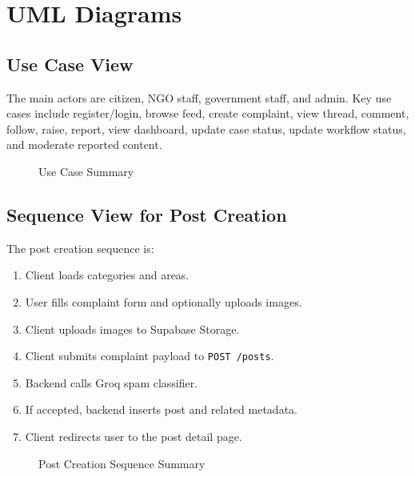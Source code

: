 \documentclass[12pt,a4paper]{report}
\begin{document}
\section{UML Diagrams}
\subsection{Use Case View}
The main actors are citizen, NGO staff, government staff, and admin. Key use cases include register/login, browse feed, create complaint, view thread, comment, follow, raise, report, view dashboard, update case status, update workflow status, and moderate reported content.

\begin{figure}[H]
\centering
{}
\caption{Use Case Summary}
\end{figure}

\subsection{Sequence View for Post Creation}
The post creation sequence is:
\begin{enumerate}
  \item Client loads categories and areas.
  \item User fills complaint form and optionally uploads images.
  \item Client uploads images to Supabase Storage.
  \item Client submits complaint payload to \texttt{POST /posts}.
  \item Backend calls Groq spam classifier.
  \item If accepted, backend inserts post and related metadata.
  \item Client redirects user to the post detail page.
\end{enumerate}

\begin{figure}[H]
\centering
{}
\caption{Post Creation Sequence Summary}
\end{figure}
\end{document}
